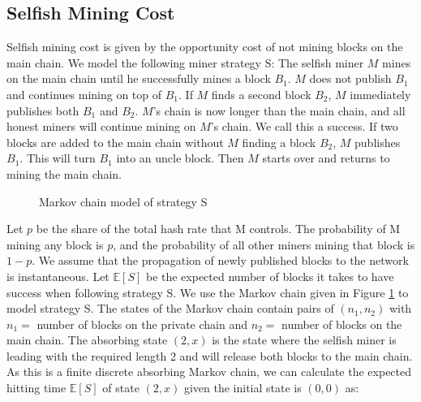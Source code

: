 \subsection{Selfish Mining Cost\label{sectionSelfishMining}}
Selfish mining cost is given by the opportunity cost of not mining blocks on the main chain. We model the following miner strategy S:
The selfish miner $M$ mines on the main chain until he successfully mines a block $B_{1}$. $M$ does not publish $B_{1}$ and continues mining on top of $B_{1}$.
If $M$ finds a second block $B_{2}$, $M$ immediately publishes both $B_{1}$ and $B_{2}$. $M$'s chain is now longer than the main chain, and all honest miners will continue mining on $M$'s chain. We call this a success. If two blocks are added to the main chain without $M$ finding a block $B_{2}$, $M$ publishes $B_{1}$. This will turn $B_{1}$ into an uncle block. Then $M$ starts over and returns to mining the main chain.

\begin{figure}[h!]
\centering
{}
\caption{Markov chain model of strategy S}
\label{MarkovFull}
\end{figure}

Let $p$ be the share of the total hash rate that M controls. The probability of M mining any block is $p$, and the probability of all other miners mining that block is $1-p$. We assume that the propagation of newly published blocks to the network is instantaneous. Let $\mathbb{E}[S]$ be the expected number of blocks it takes to have success when following strategy S. We use the Markov chain given in Figure \ref{MarkovFull} to model strategy S. The states of the Markov chain contain pairs of $(n_1,n_2)$ with $n_1=$ number of blocks on the private chain and $n_2=$ number of blocks on the main chain. The absorbing state $(2,x)$ is the state where the selfish miner is leading with the required length 2 and will release both blocks to the main chain. As this is a finite discrete absorbing Markov chain, we can calculate the expected hitting time $\mathbb{E}[S]$ of state $(2,x)$ given the initial state is $(0,0)$ as:

